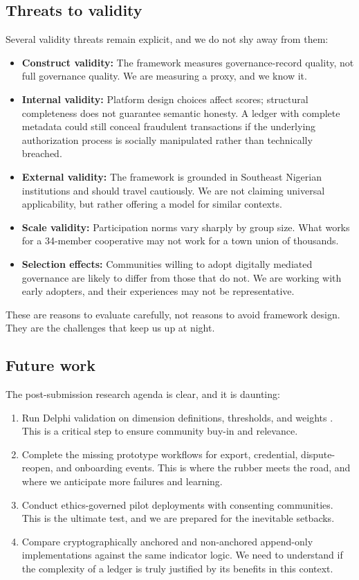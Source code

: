 \documentclass[sigconf,anonymous]{acmart}
\begin{document}
\subsection{Threats to validity}

Several validity threats remain explicit, and we do not shy away from them:

\begin{itemize}
\item \textbf{Construct validity:} The framework measures governance-record quality, not full governance quality. We are measuring a proxy, and we know it.
\item \textbf{Internal validity:} Platform design choices affect scores; structural completeness does not guarantee semantic honesty. A ledger with complete metadata could still conceal fraudulent transactions if the underlying authorization process is socially manipulated rather than technically breached.
\item \textbf{External validity:} The framework is grounded in Southeast Nigerian institutions and should travel cautiously. We are not claiming universal applicability, but rather offering a model for similar contexts.
\item \textbf{Scale validity:} Participation norms vary sharply by group size. What works for a 34-member cooperative may not work for a town union of thousands.
\item \textbf{Selection effects:} Communities willing to adopt digitally mediated governance are likely to differ from those that do not. We are working with early adopters, and their experiences may not be representative.
\end{itemize}

These are reasons to evaluate carefully, not reasons to avoid framework design. They are the challenges that keep us up at night.

\subsection{Future work}

The post-submission research agenda is clear, and it is daunting:

\begin{enumerate}
\item Run Delphi validation on dimension definitions, thresholds, and weights \cite{rowe1999}. This is a critical step to ensure community buy-in and relevance.
\item Complete the missing prototype workflows for export, credential, dispute-reopen, and onboarding events. This is where the rubber meets the road, and where we anticipate more failures and learning.
\item Conduct ethics-governed pilot deployments with consenting communities. This is the ultimate test, and we are prepared for the inevitable setbacks.
\item Compare cryptographically anchored and non-anchored append-only implementations against the same indicator logic. We need to understand if the complexity of a ledger is truly justified by its benefits in this context.
\end{enumerate}
\end{document}
